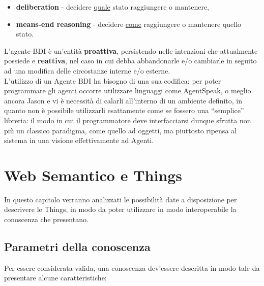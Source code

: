 \documentclass[12pt,a4paper,openright,oneside]{report}
\newcommand{\quotes}[1]{``#1''}
\begin{document}
\begin{itemize}
	\item \textbf{deliberation} - decidere \ul{quale} stato raggiungere o mantenere,
	\item \textbf{means-end reasoning} - decidere \ul{come} raggiungere o mantenere quello stato.
\end{itemize}

L'agente BDI è un'entità \textbf{proattiva}, persistendo nelle intenzioni che attualmente possiede e \textbf{reattiva}, nel caso in cui debba abbandonarle e/o cambiarle in seguito ad una modifica delle circostanze interne e/o esterne.\\

L'utilizzo di un Agente BDI ha bisogno di una sua codifica: per poter programmare gli agenti occorre utilizzare linguaggi come AgentSpeak, o meglio ancora Jason e vi è necessità di calarli all'interno di un ambiente definito, in quanto non è possibile utilizzarli esattamente come se fossero una \quotes{semplice} libreria: il modo in cui il programmatore deve interfacciarsi dunque sfrutta non più un classico paradigma, come quello ad oggetti, ma piuttosto ripensa al sistema in una visione effettivamente ad Agenti.


\clearpage{\pagestyle{empty}\cleardoublepage}
\chapter{Web Semantico e Things}           %
\lhead[\fancyplain{}{\bfseries\thepage}]{\fancyplain{}{\bfseries\rightmark}}  
In questo capitolo verranno analizzati le possibilità date a disposizione per descrivere le Things, in modo da poter utilizzare in modo interoperabile la conoscenza che presentano.


\section{Parametri della conoscenza}
Per essere considerata valida, una conoscenza dev'essere descritta in modo tale da presentare alcune caratteristiche:
\end{document}
